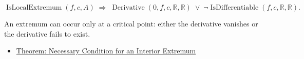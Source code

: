 \begin{remark*}
\[
\operatorname{IsLocalExtremum}(f,c,A)
\;\Rightarrow\;
\operatorname{Derivative}(0,f,c,\mathbb{R},\mathbb{R}) \;\lor\; \lnot\operatorname{IsDifferentiable}(f,c,\mathbb{R},\mathbb{R}).
\]
\end{remark*}

\begin{remark*}[Interpretation]
An extremum can occur only at a critical point: either the derivative vanishes or the derivative fails to exist.
\end{remark*}

\begin{dependencies}
\begin{itemize}
  \item \hyperref[thm:necessary-condition-extremum]{Theorem: Necessary Condition for an Interior Extremum}
\end{itemize}
\end{dependencies}
